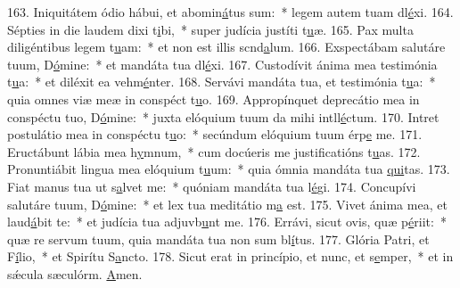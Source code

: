 163. Iniquitátem ódio hábui, et abomin\uline{á}tus sum:~* legem autem tuam dl\uline{é}xi.
164. Sépties in die laudem dixi t\uline{i}bi,~* super judícia justíti t\uline{u}æ.
165. Pax multa diligéntibus legem t\uline{u}am:~* et non est illis scnd\uline{a}lum.
166. Exspectábam salutáre tuum, D\uline{ó}mine:~* et mandáta tua dl\uline{é}xi.
167. Custodívit ánima mea testimónia t\uline{u}a:~* et diléxit ea vehm\uline{é}nter.
168. Servávi mandáta tua, et testimónia t\uline{u}a:~* quia omnes viæ meæ in conspéct t\uline{u}o.
169. Appropínquet deprecátio mea in conspéctu tuo, D\uline{ó}mine:~* juxta elóquium tuum da mihi intll\uline{é}ctum.
170. Intret postulátio mea in conspéctu t\uline{u}o:~* secúndum elóquium tuum érp\uline{e} me.
171. Eructábunt lábia mea h\uline{y}mnum,~* cum docúeris me justificatións t\uline{u}as.
172. Pronuntiábit lingua mea elóquium t\uline{u}um:~* quia ómnia mandáta tua \uline{qui}tas.
173. Fiat manus tua ut s\uline{a}lvet me:~* quóniam mandáta tua l\uline{é}gi.
174. Concupívi salutáre tuum, D\uline{ó}mine:~* et lex tua meditátio m\uline{a} est.
175. Vivet ánima mea, et laud\uline{á}bit te:~* et judícia tua adjuvb\uline{u}nt me.
176. Errávi, sicut ovis, quæ p\uline{é}riit:~* quæ re servum tuum, quia mandáta tua non sum bl\uline{í}tus.
177. Glória Patri, et F\uline{í}lio,~* et Spirítu S\uline{a}ncto.
178. Sicut erat in princípio, et nunc, et s\uline{e}mper,~* et in sǽcula sæculórm. \uline{A}men.

